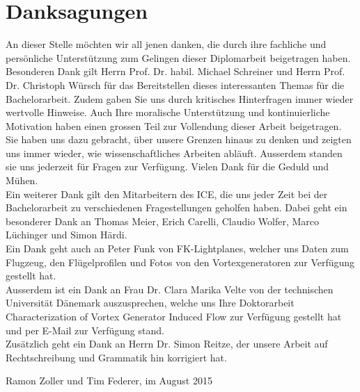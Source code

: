 \section*{Danksagungen}
\label{danksagungen}
An dieser Stelle möchten wir all jenen danken, die durch ihre fachliche und persönliche Unterstützung zum Gelingen dieser Diplomarbeit beigetragen haben.\\
Besonderen Dank gilt Herrn Prof. Dr. habil. Michael Schreiner und Herrn Prof. Dr. Christoph Würsch für das Bereitstellen dieses interessanten Themas für die Bachelorarbeit. Zudem gaben Sie uns durch kritisches Hinterfragen immer wieder wertvolle Hinweise. Auch Ihre moralische Unterstützung und kontinuierliche Motivation haben einen grossen Teil zur Vollendung dieser Arbeit beigetragen. Sie haben uns dazu gebracht, über unsere Grenzen hinaus zu denken und zeigten uns immer wieder, wie wissenschaftliches Arbeiten abläuft. Ausserdem standen sie uns jederzeit für Fragen zur Verfügung. Vielen Dank für die Geduld und Mühen.\\

Ein weiterer Dank gilt den Mitarbeitern des ICE, die uns jeder Zeit bei der Bachelorarbeit zu verschiedenen Fragestellungen geholfen haben. Dabei geht ein besonderer Dank an Thomas Meier, Erich Carelli, Claudio Wolfer, Marco Lüchinger und Simon Härdi.
\\

Ein Dank geht auch an Peter Funk von FK-Lightplanes, welcher uns Daten zum Flugzeug, den Flügelprofilen und Fotos von den Vortexgeneratoren zur Verfügung gestellt hat.\\

Ausserdem ist ein Dank an Frau Dr. Clara Marika Velte von der technischen Universität Dänemark auszusprechen, welche uns Ihre Doktorarbeit \guillemotleft{}Characterization of Vortex Generator Induced Flow\guillemotright{} zur Verfügung gestellt hat und per E-Mail zur Verfügung stand.\\

Zusätzlich geht ein Dank an Herrn Dr. Simon Reitze, der unsere Arbeit auf Rechtschreibung und Grammatik hin korrigiert hat.\\

\begin{flushright}
Ramon Zoller und Tim Federer, im August 2015
\end{flushright}
